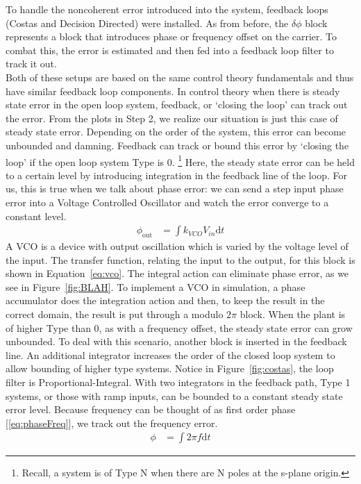 \documentclass[]{article}
\begin{document}
To handle the noncoherent error introduced into the system, feedback loops (Costas and Decision Directed) were installed.  As from before, the $\delta\phi$ block represents a block that introduces phase or frequency offset on the carrier.  To combat this, the error is estimated and then fed into a feedback loop filter to track it out. \\

Both of these setups are based on the same control theory fundamentals and thus have similar feedback loop components. In control theory when there is steady state error in the open loop system, feedback, or `closing the loop' can track out the error.  From the plots in Step 2, we realize our situation is just this case of steady state error.  Depending on the order of the system, this error can become unbounded and damning.  Feedback can track or bound this error by `closing the loop' if the open loop system Type is 0.  \footnote{Recall, a system is of Type N when there are N poles at the s-plane origin.}  Here, the steady state error can be held to a certain level by introducing integration in the feedback line of the loop.  For us, this is true when we talk about phase error: we can send a step input phase error into a Voltage Controlled Oscillator and watch the error converge to a constant level. 
\begin{align}
\label{eq:vco}
\phi_{\text{out}} &= \int \! k_{VCO}V_{in} \mathrm{d}t
\end{align}
A VCO is a device with output oscillation which is varied by the voltage level of the input.  The transfer function, relating the input to the output, for this block is shown in Equation~\ref{eq:vco}. The integral action can eliminate phase error, as we see in Figure~\ref{fig:BLAH}.  To implement a VCO in simulation, a phase accumulator does the integration   action and then, to keep the result in the correct domain, the result is put through a modulo $2\pi$ block.   
When the plant is of higher Type than 0, as with a frequency offset, the steady state error can grow unbounded.  To deal with this scenario, another block is inserted in the feedback line.  An additional integrator increases the order of the closed loop system to allow bounding of higher type systems.  Notice in Figure~\ref{fig:costas}, the loop filter is Proportional-Integral.  With two integrators in the feedback path, Type 1 systems, or those with ramp inputs, can be bounded to a constant steady state error level.  Because frequency can be thought of as first order phase [\ref{eq:phaseFreq}], we track out the frequency error.\\
\begin{align}
\label{eq:phaseFreq}
\phi &= \int \! 2\pi f \mathrm{d}t 
\end{align}
\end{document}
